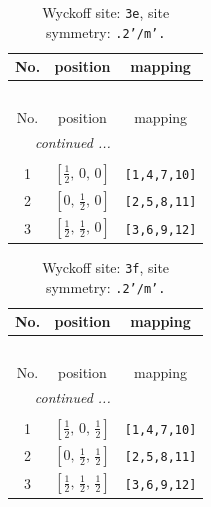 \documentclass[fleqn,8pt]{jsarticle}
\begin{document}
\begin{longtable}{ccc}
\caption{Wyckoff site: {\tt 3e}, site symmetry: {\tt .2'/m'.}}
 \\
 \hline \hline
No. & position & mapping \\ \hline \endfirsthead

\multicolumn{2}{l}{\tablename\ \thetable{}} \\
 \hline \hline
No. & position & mapping \\ \hline \endhead

 \hline \hline
\multicolumn{2}{r}{\footnotesize\it continued ...} \\ \endfoot

 \hline \hline
\multicolumn{2}{r}{} \\ \endlastfoot

1 & $\left[ \frac{1}{2},\, 0,\, 0 \right]$ & {\tt [1,4,7,10]} \\ \hline
2 & $\left[ 0,\, \frac{1}{2},\, 0 \right]$ & {\tt [2,5,8,11]} \\ \hline
3 & $\left[ \frac{1}{2},\, \frac{1}{2},\, 0 \right]$ & {\tt [3,6,9,12]} \\
\end{longtable}
\renewcommand{\arraystretch}{1.2}
\begin{longtable}{ccc}
\caption{Wyckoff site: {\tt 3f}, site symmetry: {\tt .2'/m'.}}
 \\
 \hline \hline
No. & position & mapping \\ \hline \endfirsthead

\multicolumn{2}{l}{\tablename\ \thetable{}} \\
 \hline \hline
No. & position & mapping \\ \hline \endhead

 \hline \hline
\multicolumn{2}{r}{\footnotesize\it continued ...} \\ \endfoot

 \hline \hline
\multicolumn{2}{r}{} \\ \endlastfoot

1 & $\left[ \frac{1}{2},\, 0,\, \frac{1}{2} \right]$ & {\tt [1,4,7,10]} \\ \hline
2 & $\left[ 0,\, \frac{1}{2},\, \frac{1}{2} \right]$ & {\tt [2,5,8,11]} \\ \hline
3 & $\left[ \frac{1}{2},\, \frac{1}{2},\, \frac{1}{2} \right]$ & {\tt [3,6,9,12]} \\
\end{longtable}
\renewcommand{\arraystretch}{1.2}
\end{document}
